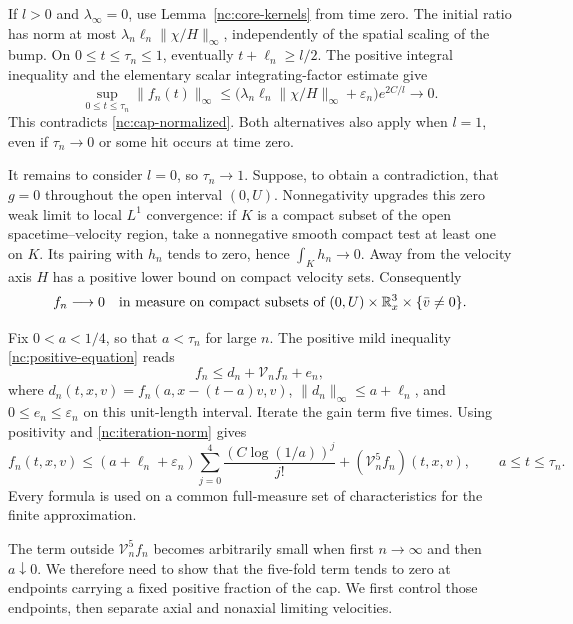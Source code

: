 If \(l>0\) and \(\lambda_\infty=0\), use
Lemma~\ref{nc:core-kernels} from time zero.  The initial ratio
has norm at most
\(\lambda_n\ell_n\|\chi/H\|_\infty\), independently of the
spatial scaling of the bump.  On \(0\le t\le\tau_n\le1\),
eventually \(t+\ell_n\ge l/2\).  The positive integral
inequality and the elementary scalar integrating-factor estimate
give
\[
 \sup_{0\le t\le\tau_n}\|f_n(t)\|_\infty
 \le
 \bigl(\lambda_n\ell_n\|\chi/H\|_\infty+\varepsilon_n\bigr)
 e^{2C/l}\longrightarrow0.
\]
This contradicts \eqref{nc:cap-normalized}.  Both alternatives
also apply when \(l=1\), even if \(\tau_n\to0\) or some hit
occurs at time zero.

It remains to consider \(l=0\), so \(\tau_n\to1\).
Suppose, to obtain a contradiction, that \(g=0\) throughout
the open interval \((0,U)\).  Nonnegativity upgrades this zero
weak limit to local \(L^1\) convergence: if \(K\) is a compact
subset of the open spacetime--velocity region, take a
nonnegative smooth compact test at least one on \(K\).  Its
pairing with \(h_n\) tends to zero, hence
\(\int_K h_n\to0\).  Away from the velocity axis \(H\) has a
positive lower bound on compact velocity sets.  Consequently
\begin{equation}
\label{nc:zero-in-measure}
 f_n\longrightarrow0
 \quad\text{in measure on compact subsets of }
 (0,U)\times\mathbb R^3_x\times\{\bar v\ne0\}.
\end{equation}

Fix \(0<a<1/4\), so that \(a<\tau_n\) for large \(n\).
The positive mild inequality \eqref{nc:positive-equation}
reads
\[
 f_n\le d_n+\mathcal V_nf_n+e_n,
\]
where \(d_n(t,x,v)=
 f_n(a,x-(t-a)v,v)\), \(\|d_n\|_\infty\le a+\ell_n\),
and \(0\le e_n\le\varepsilon_n\) on this unit-length interval.
Iterate the gain term five times.
Using positivity and \eqref{nc:iteration-norm} gives
\begin{equation}
\label{nc:five-residual}
 f_n(t,x,v)
 \le
 (a+\ell_n+\varepsilon_n)
 \sum_{j=0}^4\frac{(C\log(1/a))^j}{j!}
 +(\mathcal V_n^5 f_n)(t,x,v),
 \qquad a\le t\le\tau_n .
\end{equation}
Every formula is used on a common full-measure set of
characteristics for the finite approximation.


The term outside \(\mathcal V_n^5f_n\) becomes arbitrarily small when
first \(n\to\infty\) and then \(a\downarrow0\). We therefore need to
show that the five-fold term tends to zero at endpoints carrying a fixed
positive fraction of the cap. We first control those endpoints, then
separate axial and nonaxial limiting velocities.

